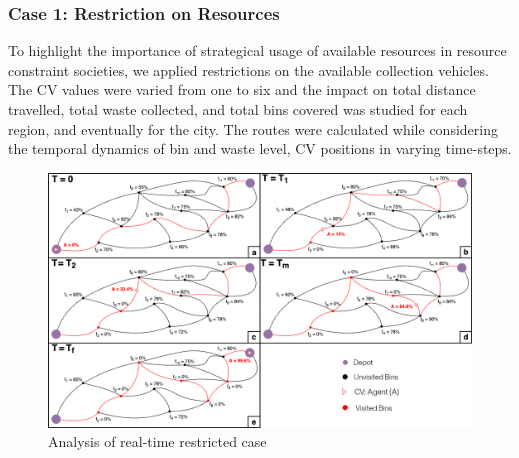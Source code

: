 \documentclass[12pt]{article}
\begin{document}
\subsubsection*{Case 1: Restriction on Resources}
To highlight the importance of strategical usage of available resources in resource constraint societies, we applied restrictions on the available collection vehicles. The CV values were varied from one to six and the impact on total distance travelled, total waste collected, and total bins covered was studied for each region, and  eventually for the city. The routes were calculated while considering the temporal dynamics of bin and waste level, CV positions in varying time-steps.
\begin{figure}[H]
    \centering
    \includegraphics[scale=1.35]{Combined graph Enlarged and table.png}
    \caption{Analysis of real-time restricted case}\label{figcom}
\end{figure}
\end{document}
